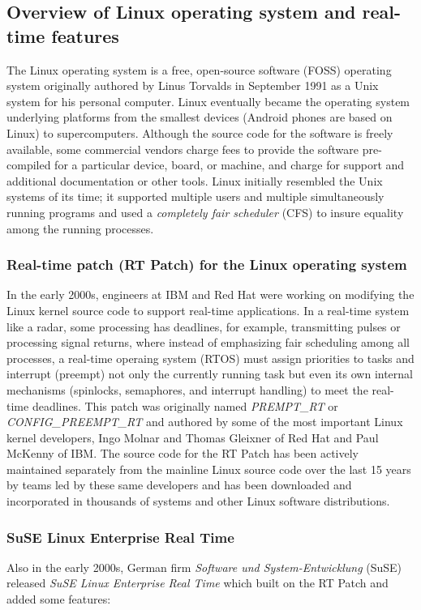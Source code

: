 \documentclass[12pt]{article}
\begin{document}
\subsection{Overview of Linux operating system and real-time features}
The Linux operating system is a free, open-source software (FOSS) operating
system originally authored by Linus Torvalds in September 1991 as a Unix system
for his personal computer.  Linux eventually became the operating system
underlying platforms from the smallest devices (Android phones are based on
Linux) to supercomputers. Although the source code for the software is freely
available, some commercial vendors charge fees to provide the software
pre-compiled for a particular device, board, or machine, and charge for support
and additional documentation or other tools.  Linux initially resembled the Unix
systems of its time; it supported multiple users and multiple simultaneously
running programs and used a \emph{completely fair scheduler} (CFS) to insure
equality among the running processes.

\subsubsection{Real-time patch (RT Patch) for the Linux operating system}
In the early 2000s, engineers at IBM and Red Hat were working on modifying the
Linux kernel source code to support real-time applications.  In a real-time
system like a radar, some processing has deadlines, for example, transmitting
pulses or processing signal returns, where instead of emphasizing fair
scheduling among all processes, a real-time operaing system (RTOS) must assign
priorities to tasks and interrupt (preempt) not only the currently running task
but even its own internal mechanisms (spinlocks, semaphores, and interrupt
handling) to meet the real-time deadlines.  This patch was originally named
\emph{PREMPT\_RT} or \emph{CONFIG\_PREEMPT\_RT} and authored by some of the most
important Linux kernel developers, Ingo Molnar and Thomas Gleixner of Red Hat
and Paul McKenny of IBM.  The source code for the RT Patch has been actively
maintained separately from the mainline Linux source code over the last 15 years
by teams led by these same developers and has been downloaded and incorporated
in thousands of systems and other Linux software distributions.

\subsubsection{SuSE Linux Enterprise Real Time}
Also in the early 2000s, German firm \emph{Software und System-Entwicklung}
(SuSE) released \emph{SuSE Linux Enterprise Real Time} which built on the RT
Patch and added some features:
\end{document}
